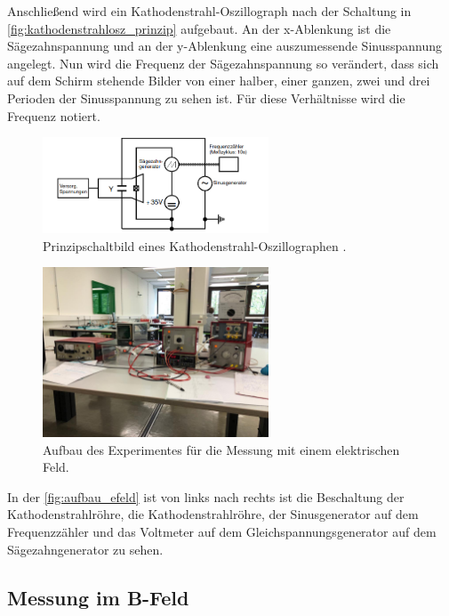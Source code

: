     \noindent Anschließend wird ein Kathodenstrahl-Oszillograph nach der Schaltung in \autoref{fig:kathodenstrahlosz_prinzip} aufgebaut. 
    An der x-Ablenkung ist die Sägezahnspannung und an der y-Ablenkung eine auszumessende Sinusspannung angelegt. Nun wird die Frequenz der
    Sägezahnspannung so verändert, dass sich auf dem Schirm stehende Bilder von einer halber, einer ganzen, zwei und drei Perioden der Sinusspannung
    zu sehen ist. Für diese Verhältnisse wird die Frequenz notiert.

    \begin{figure}[H]
        \centering
        \includegraphics[width=0.6\textwidth]{bilder/prinzipschaltbild_kathodenstrahl.png}
        \caption{Prinzipschaltbild eines Kathodenstrahl-Oszillographen \cite{anleitung501}.}
        \label{fig:kathodenstrahlosz_prinzip}
    \end{figure}

    \begin{figure}[H]
        \centering
        \includegraphics[width=0.6\textwidth]{bilder/foto_elektrisch.jpeg}
        \caption{Aufbau des Experimentes für die Messung mit einem elektrischen Feld.}
        \label{fig:aufbau_efeld}
    \end{figure} 

    \noindent In der \autoref{fig:aufbau_efeld} ist von links nach rechts ist die Beschaltung der Kathodenstrahlröhre, die Kathodenstrahlröhre, der Sinusgenerator auf dem 
    Frequenzzähler und das Voltmeter auf dem Gleichspannungsgenerator auf dem Sägezahngenerator zu sehen.

\subsection{Messung im B-Feld}

